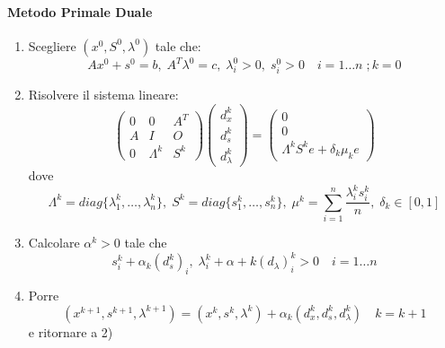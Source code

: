 \paragraph{Metodo Primale Duale}
\begin{center}
\fbox
{
 \begin{minipage}[position]{0.85\textwidth}
\begin{enumerate}
\item Scegliere $(x^{0}, S^{0}, \lambda^{0})$ tale che:
   $$ Ax^{0} + s^{0} = b, \; A^{T} \lambda^{0} = c, \;
  \lambda_i^{0}>0, \; s_i^{0}>0 \quad i = 1\ldots n \; ; k=0 $$
\item Risolvere il sistema lineare:
$$
\begin{pmatrix}
 0 & 0 & A^{T} \\
 A & I & O  \\
 0 & \Lambda^{k} & S^{k}
\end{pmatrix}
\begin{pmatrix}
 d_{x}^{k} \\
 d_{s}^{k} \\
 d_{\lambda}^{k}
\end{pmatrix}
=
\begin{pmatrix}
0 \\
 0 \\
 \Lambda^{k} S^{k} e + \delta_k \mu_k e 
\end{pmatrix}
$$
dove
$$\Lambda^{k} = diag\{ \lambda_1^{k}, \ldots, \lambda_n^{k}\}, \;
S^{k} = diag\{ s_1^{k}, \ldots, s_n^{k}\}, \;
\mu^{k} = \displaystyle \sum_{i=1}^{n} \dfrac{\lambda_i^{k}s_i^{k}}{n}, \;
\delta_k \in [0,1]
$$
\item  Calcolare $\alpha^{k} > 0$ tale che
$$ s_i^{k} + \alpha_k(d_s^{k})_i, \; \lambda_i^{k} + \alpha+k(d_{\lambda})_i^{k}>0
\quad i=1 \ldots n$$
\item Porre $$(x^{k+1}, s^{k+1}, \lambda^{k+1}) = 
  (x^{k}, s^{k}, \lambda^{k}) + \alpha_k(d_x^{k}, d_s^{k}, d_{\lambda}^{k})
\quad k=k+1
$$
e ritornare a 2)
\end{enumerate}
\end{minipage}
}
\end{center}

\outbpdocument


